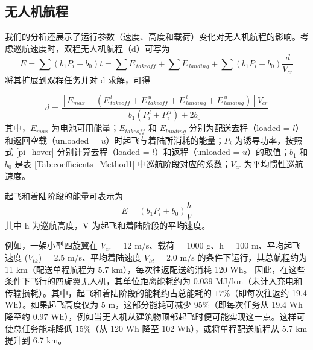 \documentclass{article}
\begin{document}
\subsection{无人机航程}
我们的分析还展示了运行参数（速度、高度和载荷）变化对无人机航程的影响。考虑巡航速度时，双程无人机航程（d）可写为
\begin{equation}
    E = \sum(b_{1}P_{i} + b_{0})t = \sum E_{\,takeoff} + \sum E_{\,landing} + \sum (b_{1}P_{i} + b_{0}) \frac{d}{V_{cr}}
\end{equation}
将其扩展到双程任务并对 d 求解，可得

\begin{equation}
    d = \frac{
    \left[E_{max} - \left(E_{\,takeoff}^{\,l} + E_{\,takeoff}^{\,u} + E_{\,landing}^{\,l} + E_{\,landing}^{\,u} \right)\right]V_{cr}}{b_{1} \left(P_{i}^{\,l}+P_{i}^{\,u}\right)  + 2b_{0} }
\end{equation}
其中，$E_{max}$ 为电池可用能量；$E_{takeoff}$ 和 $E_{landing}$ 分别为配送去程（loaded = $l$）和返回空载（unloaded = $u$）时起飞与着陆所消耗的能量；$P_{i}$ 为诱导功率，按照式 \ref{pi_hover} 分别计算去程（loaded = $l$）和返程（unloaded = $u$）的取值；$b_{1}$ 和 $b_{0}$ 是表 \ref{Tab:coefficients_Method1} 中巡航阶段对应的系数；$V_{cr}$ 为平均惯性巡航速度。

起飞和着陆阶段的能量可表示为
\begin{equation}
    E = \left(b_{1}P_{i} + b_{0}\right)\frac{h}{V}
\end{equation}
其中 h 为巡航高度，V 为起飞和着陆阶段的平均速度。 

例如，一架小型四旋翼在 $V_{cr}$ = 12 m/s、载荷 = 1000 g、h = 100 m、平均起飞速度 ($V_{tk}$) = 2.5 m/s、平均着陆速度 $V_{ld}$ = 2.0 m/s 的条件下运行，其总航程约为 11 km（配送单程航程为 5.7 km），每次往返配送约消耗 120 Wh。 
因此，在这些条件下飞行的四旋翼无人机，其单位距离能耗约为 0.039 MJ/km（未计入充电和传输损耗）。其中，起飞和着陆阶段的能耗约占总能耗的 $17\%$（即每次往返约 19.4 Wh）。如果起飞高度仅为 5 m，这部分能耗可减少 95\%（即每次任务从 19.4 Wh 降至约 0.97 Wh），例如当无人机从建筑物顶部起飞时便可能实现这一点。这样可使总任务能耗降低 15\%（从 120 Wh 降至 102 Wh），或将单程配送航程从 5.7 km 提升到 6.7 km。  
\end{document}

